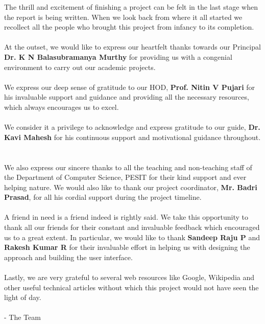 \documentclass{report}
\begin{document}
\begin{coverpage}
\end{coverpage}

\begin{certificate}
\end{certificate}

\begin{acknowledgement}

        The thrill and excitement of finishing a project can be felt in the last stage when the report is being written. When we look back from where it all started we recollect all the people who brought this project from infancy to its completion.
        ~\\\\
        At the outset, we would like to express our heartfelt thanks towards our Principal \textbf{Dr. K N Balasubramanya Murthy} for providing us with a congenial environment to carry out our academic projects.
        ~\\\\
        We express our deep sense of gratitude to our HOD, \textbf{Prof. Nitin V Pujari} for his invaluable support and guidance and providing all the necessary resources, which always encourages us to excel.
        ~\\\\
        We consider it a privilege to acknowledge and express gratitude to our guide, \textbf{Dr. Kavi Mahesh} for his continuous support and motivational guidance throughout.
        ~\\\\
        We also express our sincere thanks to all the teaching and non-teaching staff of the Department of Computer Science, PESIT for their kind support and ever helping nature. We would also like to thank our project coordinator, \textbf{Mr. Badri Prasad}, for all his cordial support during the project timeline.
        ~\\\\
        A friend in need is a friend indeed is rightly said. We take this opportunity to thank all our friends for their constant and invaluable feedback which encouraged us to a great extent. In particular, we would like to thank \textbf{Sandeep Raju P} and \textbf{Rakesh Kumar R} for their invaluable effort in helping us with designing the approach and building the user interface.
        ~\\\\
        Lastly, we are very grateful to several web resources like Google, Wikipedia and other useful technical articles without which this project would not have seen the light of day.
        ~\\\\
        - The Team
    
\end{acknowledgement}
\end{document}
